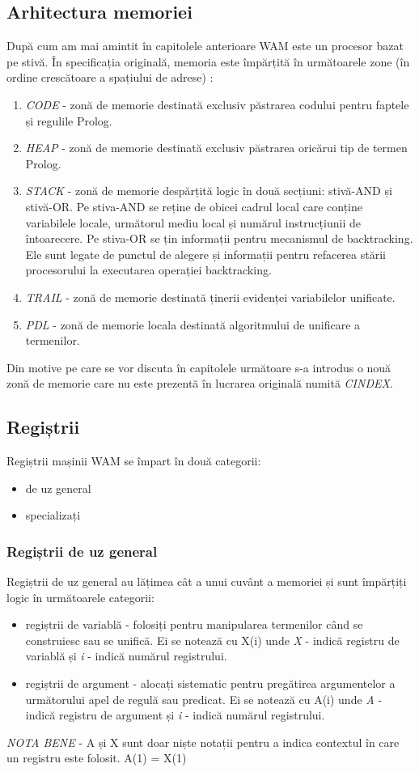 \documentclass[12pt,a4paper,twoside]{report}
\begin{document}
\subsection{Arhitectura memoriei}
După cum am mai amintit în capitolele anterioare WAM este un procesor bazat pe stivă. În specificația originală, memoria este împărțită în următoarele zone (în ordine crescătoare a spațiului de adrese) :
\begin{enumerate}
	\item \textit{CODE} - zonă de memorie destinată exclusiv păstrarea codului pentru faptele și regulile Prolog.
	\item \textit{HEAP} - zonă de memorie destinată exclusiv păstrarea oricărui tip de termen Prolog.
	\item \textit{STACK} - zonă de memorie despărțită logic în două secțiuni: stivă-AND și stivă-OR. Pe stiva-AND se reține de obicei cadrul local care conține variabilele locale, următorul mediu local și numărul instrucțiunii de întoarecere. Pe stiva-OR se țin informații pentru mecanismul de backtracking. Ele sunt legate de punctul de alegere și informații pentru refacerea stării procesorului la executarea operației backtracking.
	\item \textit{TRAIL} - zonă de memorie destinată ținerii evidenței variabilelor unificate.
	\item \textit{PDL} - zonă de memorie locala destinată algoritmului de unificare a termenilor.
\end{enumerate}
Din motive pe care se vor discuta în capitolele următoare s-a introdus o nouă zonă de memorie care nu este prezentă în lucrarea originală numită \textit{CINDEX}.
\subsection{Regiștrii}
Regiștrii mașinii WAM se împart în două categorii:
\begin{itemize}
	\item de uz general
	\item specializați
\end{itemize}

\subsubsection{Regiștrii de uz general}
Regiștrii de uz general au lățimea cât a unui cuvânt a memoriei și sunt împărțiți logic în următoarele categorii:
\begin{itemize}
	\item regiștrii de variablă - folosiți pentru manipularea termenilor când se construiesc sau se unifică. Ei se notează cu X(i) unde \textit{X} - indică registru de variablă și \textit{i} - indică numărul registrului.
	\item regiștrii de argument - alocați sistematic pentru pregătirea argumentelor a următorului apel de regulă sau predicat. Ei se notează cu A(i) unde \textit{A} - indică registru de argument și \textit{i} - indică numărul registrului.
\end{itemize}
\textit{NOTA BENE} - A și X sunt doar niște notații pentru a indica contextul în care un registru este folosit. A(1) = X(1)
\end{document}
